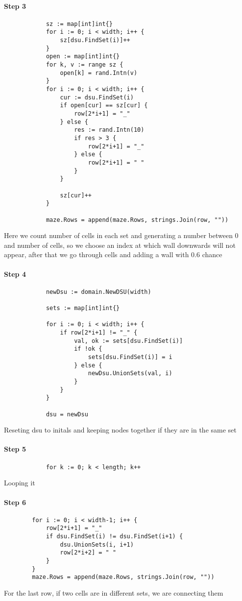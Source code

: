 		\paragraph{Step 3}
		\begin{lstlisting}
			sz := map[int]int{}
			for i := 0; i < width; i++ {
				sz[dsu.FindSet(i)]++
			}
			open := map[int]int{}
			for k, v := range sz {
				open[k] = rand.Intn(v)
			}
			for i := 0; i < width; i++ {
				cur := dsu.FindSet(i)
				if open[cur] == sz[cur] {
					row[2*i+1] = "_"
				} else {
					res := rand.Intn(10)
					if res > 3 {
						row[2*i+1] = "_"
					} else {
						row[2*i+1] = " "
					}
				}

				sz[cur]++
			}
	
			maze.Rows = append(maze.Rows, strings.Join(row, ""))
		\end{lstlisting}
		Here we count number of cells in each set and generating a number between 0 and number of cells, so we choose an index at which wall downwards will not appear, after that we go through cells and adding a wall with 0.6 chance
		
		\paragraph{Step 4}
		\begin{lstlisting}
			newDsu := domain.NewDSU(width)

			sets := map[int]int{}

			for i := 0; i < width; i++ {
				if row[2*i+1] != "_" {
					val, ok := sets[dsu.FindSet(i)]
					if !ok {
						sets[dsu.FindSet(i)] = i
					} else {
						newDsu.UnionSets(val, i)
					}
				}
			}

			dsu = newDsu
		\end{lstlisting}
		Reseting dsu to initals and keeping nodes together if they are in the same set
		
		\paragraph{Step 5}
		\begin{lstlisting}
			for k := 0; k < length; k++
		\end{lstlisting}
		Looping it
		
		\paragraph{Step 6}
		\begin{lstlisting}
		for i := 0; i < width-1; i++ {
			row[2*i+1] = "_"
			if dsu.FindSet(i) != dsu.FindSet(i+1) {
				dsu.UnionSets(i, i+1)
				row[2*i+2] = " "
			}
		}	
		maze.Rows = append(maze.Rows, strings.Join(row, ""))
		\end{lstlisting}
		For the last row, if two cells are in different sets, we are connecting them
		
